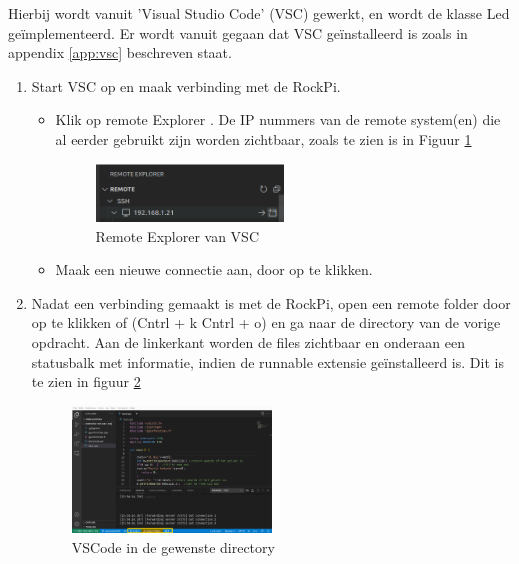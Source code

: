 Hierbij wordt vanuit 'Visual Studio Code' (VSC) gewerkt, en wordt de klasse Led geïmplementeerd. Er wordt vanuit gegaan dat VSC geïnstalleerd is zoals in appendix  \ref{app:vsc} beschreven staat.  
\begin{enumerate}
	\item Start VSC op en maak verbinding met de RockPi.
	\begin{itemize}
		\item Klik op remote Explorer . De IP nummers van de remote system(en) die al eerder gebruikt zijn worden zichtbaar, zoals te zien is in Figuur \ref{fig:remNr}
		\begin{figure}[h!]
			\centering
			\begin{center} 	
				\includegraphics[width=0.5\textwidth]{figuren/remoteExplorer2}
				\caption{Remote Explorer van VSC}
				\label{fig:remNr}   
			\end{center}
		\end{figure}
				 
		\item  Maak een nieuwe connectie aan, door op  te klikken.

      \end{itemize}
      
      \item Nadat een verbinding gemaakt is met de RockPi, open een remote folder door op  te klikken of (Cntrl + k Cntrl + o) en ga naar de directory van de vorige opdracht. Aan de linkerkant worden de files zichtbaar en onderaan een statusbalk met informatie, indien de runnable extensie  geïnstalleerd is. Dit is te zien in figuur \ref{fig:vncOp}
  		\begin{figure}[h!]
  	\centering
  	\begin{center} 	
  		\includegraphics[width=0.5\textwidth]{figuren/vncSchermOp1}
  		\caption{VSCode in de gewenste directory}
  		\label{fig:vncOp}   
  	\end{center}
  \end{figure}    


\end{enumerate}
